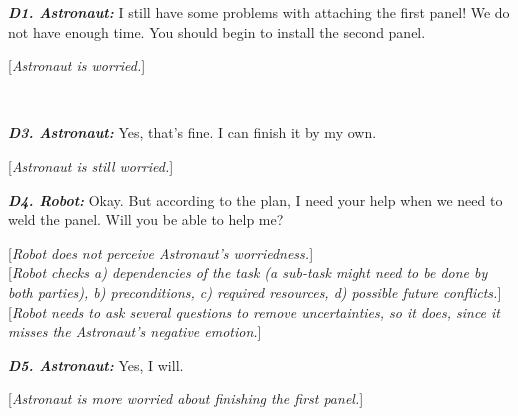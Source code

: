 \begin{spacing}{1.2}
\small{
\begin{description}
  \item \textit{\textbf{D1. Astronaut:}} I still have some problems with
  attaching the first panel! We do not have enough time. You should begin to
  install the second panel.

  [\textit{Astronaut is worried.}]\\

  \item {}\\
  
  \item \textit{\textbf{D3. Astronaut:}} Yes, that's fine. I can finish it by my
  own.

  [\textit{Astronaut is still worried.}]\\
  
  \item \textit{\textbf{D4. Robot:}} Okay. But according to the plan, I need
  your help when we need to weld the panel. Will you be able to help me?

  [\textit{Robot does not perceive Astronaut's worriedness.}]\\

  [\textit{Robot checks a) dependencies of the task (a sub-task might need to be
  done by both parties), b) preconditions, c) required resources, d) possible
  future conflicts.}]\\
  
  [\textit{Robot needs to ask several questions to remove uncertainties, so it
  does, since it misses the Astronaut's negative emotion.}]\\
  
  \item \textit{\textbf{D5. Astronaut:}} Yes, I will.
  
  [\textit{Astronaut is more worried about finishing the first panel.}]\\
  

\end{description}}
\end{spacing}
